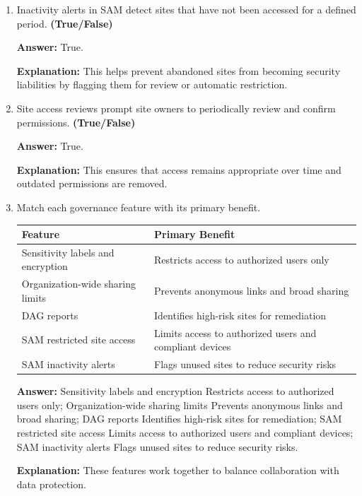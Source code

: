 \documentclass[10pt]{article}
\begin{document}
\begin{enumerate}[leftmargin=*]
\item Inactivity alerts in SAM detect sites that have not been accessed for a defined period. \textbf{(True/False)}

\textbf{Answer:} True.

\textbf{Explanation:} This helps prevent abandoned sites from becoming security liabilities by flagging them for review or automatic restriction.

\item Site access reviews prompt site owners to periodically review and confirm permissions. \textbf{(True/False)}

\textbf{Answer:} True.

\textbf{Explanation:} This ensures that access remains appropriate over time and outdated permissions are removed.

\item Match each governance feature with its primary benefit.

\begin{center}
\begin{tabular}{>{\raggedright\arraybackslash}p{} >{\raggedright\arraybackslash}p{}}
\toprule
\textbf{Feature} & \textbf{Primary Benefit} \\
\midrule
Sensitivity labels and encryption & Restricts access to authorized users only \\
Organization-wide sharing limits & Prevents anonymous links and broad sharing \\
DAG reports & Identifies high-risk sites for remediation \\
SAM restricted site access & Limits access to authorized users and compliant devices \\
SAM inactivity alerts & Flags unused sites to reduce security risks \\
\bottomrule
\end{tabular}
\end{center}

\textbf{Answer:} Sensitivity labels and encryption \textrightarrow{} Restricts access to authorized users only; Organization-wide sharing limits \textrightarrow{} Prevents anonymous links and broad sharing; DAG reports \textrightarrow{} Identifies high-risk sites for remediation; SAM restricted site access \textrightarrow{} Limits access to authorized users and compliant devices; SAM inactivity alerts \textrightarrow{} Flags unused sites to reduce security risks.

\textbf{Explanation:} These features work together to balance collaboration with data protection.


\end{enumerate}
\end{document}
